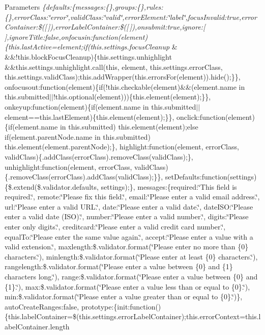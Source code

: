 {\begin{DoxyParams}{Parameters}
{\em \{defaults\+:\{messages\+:\{\},groups\+:\{\},rules\+:\{\},error\+Class\+:\char`\"{}error\char`\"{},valid\+Class\+:\char`\"{}valid\char`\"{},error\+Element\+:\char`\"{}label\char`\"{},focus\+Invalid\+:true,error\+Container\+:\$(\mbox{[}$\,$\mbox{]}),error\+Label\+Container\+:\$(\mbox{[}$\,$\mbox{]}),onsubmit\+:true,ignore\+:\mbox{[}$\,$\mbox{]},ignore\+Title\+:false,onfocusin\+:function(element)\{this.\+last\+Active=element;if(this.\+settings.\+focus\+Cleanup} & \&\&!this.block\+Focus\+Cleanup)\{this.\+settings.\+unhighlight \&\&this.\+settings.\+unhighlight.\+call(this, element, this.\+settings.\+error\+Class, this.\+settings.\+valid\+Class);this.\+add\+Wrapper(this.\+errors\+For(element)).hide();\}\}, onfocusout\+:function(element)\{if(!this.checkable(element)\&\&(element.\+name in this.\+submitted$\vert$$\vert$!this.optional(element)))\{this.\+element(element);\}\}, onkeyup\+:function(element)\{if(element.\+name in this.\+submitted$\vert$$\vert$element==this.\+last\+Element)\{this.\+element(element);\}\}, onclick\+:function(element)\{if(element.\+name in this.\+submitted) this.\+element(element);else if(element.\+parent\+Node.\+name in this.\+submitted) this.\+element(element.\+parent\+Node);\}, highlight\+:function(element, error\+Class, valid\+Class)\{.add\+Class(error\+Class).remove\+Class(valid\+Class);\}, unhighlight\+:function(element, error\+Class, valid\+Class)\{.remove\+Class(error\+Class).add\+Class(valid\+Class);\}\}, set\+Defaults\+:function(settings)\{\$.extend(\$.validator.\+defaults, settings);\}, messages\+:\{required\+:\char`\"{}\+This field is required.\char`\"{}, remote\+:\char`\"{}\+Please fix this field.\char`\"{}, email\+:\char`\"{}\+Please enter a valid email address.\char`\"{}, url\+:\char`\"{}\+Please enter a valid U\+R\+L.\char`\"{}, date\+:\char`\"{}\+Please enter a valid date.\char`\"{}, date\+I\+SO\+:\char`\"{}\+Please enter a valid date (\+I\+S\+O).\char`\"{}, number\+:\char`\"{}\+Please enter a valid number.\char`\"{}, digits\+:\char`\"{}\+Please enter only digits.\char`\"{}, creditcard\+:\char`\"{}\+Please enter a valid credit card number.\char`\"{}, equal\+To\+:\char`\"{}\+Please enter the same value again.\char`\"{}, accept\+:\char`\"{}\+Please enter a value with a valid extension.\char`\"{}, maxlength\+:\$.validator.\+format(\char`\"{}\+Please enter no more than \{0\} characters.\char`\"{}), minlength\+:\$.validator.\+format(\char`\"{}\+Please enter at least \{0\} characters.\char`\"{}), rangelength\+:\$.validator.\+format(\char`\"{}\+Please enter a value between \{0\} and \{1\} characters long.\char`\"{}), range\+:\$.validator.\+format(\char`\"{}\+Please enter a value between \{0\} and \{1\}.\char`\"{}), max\+:\$.validator.\+format(\char`\"{}\+Please enter a value less than or equal to \{0\}.\char`\"{}), min\+:\$.validator.\+format(\char`\"{}\+Please enter a value greater than or equal to \{0\}.\char`\"{})\}, auto\+Create\+Ranges\+:false, prototype\+:\{init\+:function()\{this.\+label\+Container=\$(this.\+settings.\+error\+Label\+Container);this.\+error\+Context=this.\+label\+Container.\+length 
\end{DoxyParams}}
